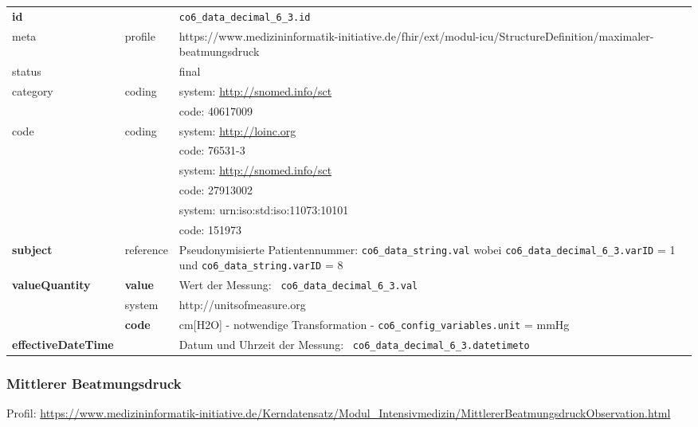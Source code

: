 \begin{longtable}{|l|l|p{7.5cm}|}
        \hline
        \rowcolor{lightgray} \multicolumn{3}{|l|}{Data Mapping (inhaltlich)} \\ \hline
        \textbf{id} &  & \texttt{co6\_data\_decimal\_6\_3.id} \\ \hline
	meta & profile & https://www.medizininformatik-initiative.de/fhir/ext/modul-icu/StructureDefinition/maximaler-beatmungsdruck \\ \hline 
	status &  & final   \\ \hline 
	category & coding & system: \url{http://snomed.info/sct} \\
\cline{3-3}
	& & code: 40617009 \\ \hline
	code & coding & system: \url{http://loinc.org} \\ 
	\cline{3-3} 
	&  & code: 76531-3 \\ 
	\cline{3-3} 
	&  & system: \url{http://snomed.info/sct} \\ 
	\cline{3-3}
	&  & code: 27913002 \\ 
	\cline{3-3} 
	&  & system: urn:iso:std:iso:11073:10101 \\ 
	\cline{3-3}
	&  & code: 151973 \\ \hline
	 \textbf{subject} & reference & Pseudonymisierte Patientennummer: \texttt{co6\_data\_string.val} wobei \texttt{co6\_data\_decimal\_6\_3.varID} = 1 und \texttt{co6\_data\_string.varID} = 8 \\ \hline
	 \textbf{valueQuantity}  & \textbf{value} & Wert der Messung: \texttt{
co6\_data\_decimal\_6\_3.val} \\
        \cline{2-3}
         & system & http://unitsofmeasure.org \\
         \cline{2-3}
         & \textbf{code} & cm[H2O] - notwendige Transformation - \texttt{co6\_config\_variables.unit} = mmHg \\ \hline
     \textbf{effectiveDateTime}  & & Datum und Uhrzeit der Messung: \texttt{
co6\_data\_decimal\_6\_3.datetimeto} \\ \hline
\end{longtable}


\subsubsection{Mittlerer Beatmungsdruck} 

Profil: \url{https://www.medizininformatik-initiative.de/Kerndatensatz/Modul_Intensivmedizin/MittlererBeatmungsdruckObservation.html}

